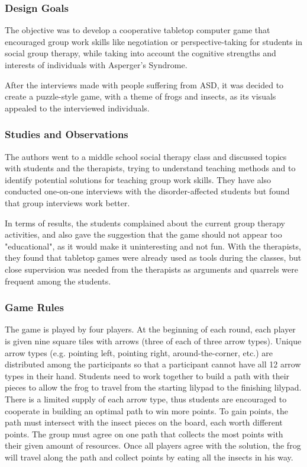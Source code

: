 \documentclass[runningheads]{llncs}
\begin{document}
\subsubsection{Design Goals}
\par The objective was to develop a cooperative tabletop computer game that encouraged group work skills like negotiation or perspective-taking for students in social group therapy, while taking into account the cognitive strengths and interests of individuals with Asperger's Syndrome.
\par After the interviews made with people suffering from ASD, it was decided to create a puzzle-style game, with a theme of frogs and insects, as its visuals appealed to the interviewed individuals.

\subsubsection{Studies and Observations}
\par The authors went to a middle school social therapy class and discussed topics with students and the therapists, trying to understand teaching methods and to identify potential solutions for teaching group work skills. They have also conducted one-on-one interviews with the disorder-affected students but found that group interviews work better. 
\par In terms of results, the students complained about the current group therapy activities, and also gave the suggestion that the game should not appear too "educational", as it would make it uninteresting and not fun. With the therapists, they found that tabletop games were already used as tools during the classes, but close supervision was needed from the therapists as arguments and quarrels were frequent among the students.

\subsubsection{Game Rules}
\par The game is played by four players. At the beginning of each round, each player is given nine square tiles with arrows (three of each of three arrow types). Unique arrow types (e.g. pointing left, pointing right, around-the-corner, etc.) are distributed among the participants so that a participant cannot have all 12 arrow types in their hand. Students need to work together to build a path with their pieces to allow the frog to travel from the starting lilypad to the finishing lilypad. There is a limited supply of each arrow type, thus students are encouraged to cooperate in building an optimal path to win more points. To gain points, the path must intersect with the insect pieces on the board, each worth different points. The group must agree on one path that collects the most points with their given amount of resources. Once all players agree with the solution, the frog will travel along the path and collect points by eating all the insects in his way.
\end{document}
